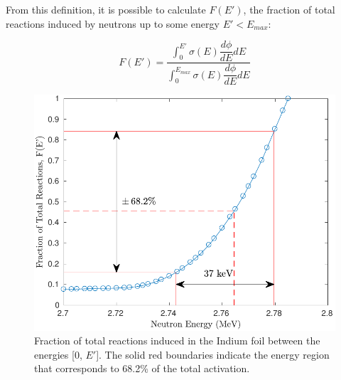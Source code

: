 \documentclass[5p]{elsarticle}
\newcommand{\pp}[1]{\left( #1\right)}
\newcommand{\comment}[1]{\todo[color=blue!20!white,inline]{ASV: #1}}
\begin{document}

From this definition, it is possible to calculate $F\pp{E'}$, the fraction of total reactions induced by neutrons up to some energy $E' < E_{max}$:

\begin{equation}\label{eqn:react_fraction}
F\pp{E'} = \dfrac{\int_0^{E'} \sigma(E) \dfrac{d\phi}{dE} dE}{\int_0^{E_{max}} \sigma(E) \dfrac{d\phi}{dE} dE}
\end{equation}




\begin{figure}
 \centering
 \includegraphics[scale=0.6]{./figures/fracplot_new.pdf}
 \caption{Fraction of total reactions induced in the Indium foil between the energies [0, $E'$]. The solid red boundaries indicate the energy region that corresponds to 68.2\% of the total activation.}
 \label{fig:frac_plot}
\end{figure}
\end{document}
